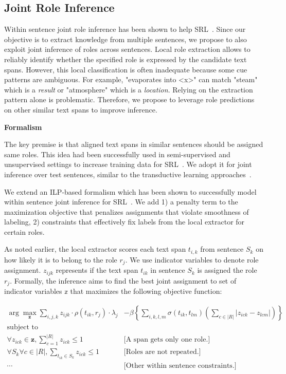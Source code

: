 \subsection{Joint Role Inference}

Within sentence joint role inference has been shown to help SRL~\cite{punyakanok2004srl,koomen2005generalized}.
Since our objective is to extract knowledge from multiple sentences, we propose to also exploit joint inference of roles across sentences. Local role extraction allows to reliably identify whether the specified role is expressed by the candidate text spans. However, this local classification is often inadequate because some cue patterns are ambiguous. For example, "evaporates into <x>" can match "steam" which is a {\em result} or "atmosphere" which is a {\em location}. Relying on the extraction pattern alone is problematic. Therefore, we propose to leverage role predictions on other similar text spans to improve inference. 


{\bf Formalism}

The key premise is that aligned text spans in similar sentences should be assigned same roles. This idea had been successfully used in semi-supervised and unsupervised settings to increase training data for SRL~\cite{furstenau-emnlp2009,furstenau2012semi,lang-emnlp2011}. We adopt it for joint inference over test sentences, similar to the transductive learning approaches~\cite{?}.

We extend an ILP-based formalism which has been shown to successfully model within sentence joint inference for SRL~\cite{punyakanok2004srl}. We add 1) a penalty term to the maximization objective that penalizes assignments that violate smoothness of labeling, 2) constraints that effectively fix labels from the local extractor for certain roles. 

As noted earlier, the local extractor scores each text span $t_{i,k}$ from sentence $S_k$ on how likely it is to belong to the role $r_j$. We use indicator variables to denote role assignment. $z_{ijk}$ represents if the text span $t_{ik}$ in sentence $S_k$ is assigned the role $r_j$. Formally, the inference aims to find the best joint assignment to set of indicator variables $\mathbb{z}$ that maximizes the following objective function:

\begin{align*}
 \arg\max_{\mathbf{z}}  \sum_{i,j,k} z_{ijk} \cdot \rho(t_{ik}, r_j) \cdot \lambda_{j}
	&- \beta \left\{ \sum_{i,k,l,m} \sigma(t_{ik}, t_{lm}) \left(\sum_{c \in |R|} |z_{ick} - z_{lcm}| \right) \right\}\\
\mbox{subject to} \\
\forall z_{ick} \in \mathbf{z}, \sum_{c = 1}^{|R|} z_{ick} \le 1  &\mbox{[A span gets only one role.]}\\
\forall S_k \forall c \in |R|, \sum_{t_{ik} \in S_k} z_{ick} \le 1  & \mbox{[Roles are not repeated.]} \\
 \cdots&  \mbox{[Other within sentence constraints.]}
\end{align*}

